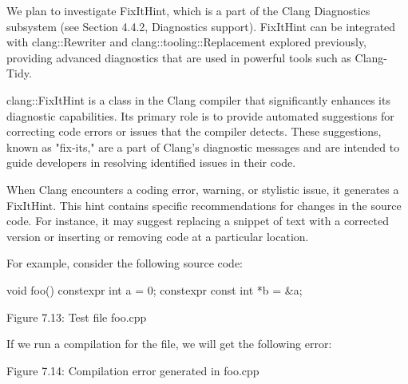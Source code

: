 We plan to investigate FixItHint, which is a part of the Clang Diagnostics subsystem (see Section 4.4.2, Diagnostics support). FixItHint can be integrated with clang::Rewriter and clang::tooling::Replacement explored previously, providing advanced diagnostics that are used in powerful tools such as Clang-Tidy.



clang::FixItHint is a class in the Clang compiler that significantly enhances its diagnostic capabilities. Its primary role is to provide automated suggestions for correcting code errors or issues that the compiler detects. These suggestions, known as "fix-its," are a part of Clang's diagnostic messages and are intended to guide developers in resolving identified issues in their code.

When Clang encounters a coding error, warning, or stylistic issue, it generates a FixItHint. This hint contains specific recommendations for changes in the source code. For instance, it may suggest replacing a snippet of text with a corrected version or inserting or removing code at a particular location.

For example, consider the following source code:

\begin{cpp}
void foo() {
  constexpr int a = 0;
  constexpr const int *b = &a;
}
\end{cpp}

\begin{center}
Figure 7.13: Test file foo.cpp
\end{center}

If we run a compilation for the file, we will get the following error:


\begin{center}
Figure 7.14: Compilation error generated in foo.cpp
\end{center}

